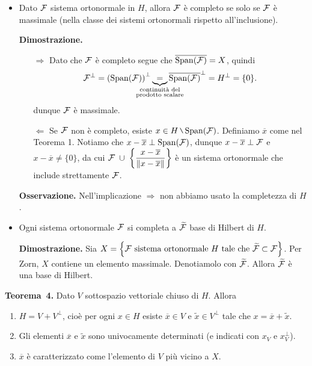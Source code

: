 \begin{itemize}
\newpage

\item Dato $\mathcal{F}$ sistema ortonormale in $H$, allora $\mathcal{F}$ è completo se solo se $\mathcal{F}$ è massimale (nella classe dei sistemi ortonormali rispetto all'inclusione).

\textbf{Dimostrazione.}
\begin{itemize}

\item[$\boxed{\Rightarrow}$] Dato che $\mathcal{F}$ è completo segue che $\overline{\operatorname{Span}(\mathcal{F})} = X$, quindi
%
$$
\mc{F}^{\perp} = \left( \spn(\mc{F}) \right)^\perp
\underbrace{=}_{\mathclap{\substack{\text{continuità del} \\ \text{prodotto scalare}}}} \overline{\spn(\mc{F})}^\perp = H^\perp = \{ 0 \}.
$$
%
dunque $\mathcal{F}$ è massimale.

\item[$\boxed{\Leftarrow}$] Se  $\mathcal{F}$ non è completo, esiste $x \in H \setminus \spn(\mc{F})$.
Definiamo $\overline{x}$ come nel Teorema 1. Notiamo che $x - \overline{x} \perp \operatorname{Span}(\mathcal{F})$, dunque $x - \overline{x} \perp \mathcal{F}$ e $x - \overline{x} \neq \{ 0 \}$, da cui $\displaystyle \mathcal{F} \; \cup \; \left\{ \frac{x - \overline{x}}{\left\lVert x - \overline{x} \right\rVert} \right\}$ è un sistema ortonormale che include strettamente $\mathcal{F}$. \absurd

\end{itemize}


\textbf{Osservazione.} Nell'implicazione $\boxed{\Rightarrow}$ non abbiamo usato la completezza di $H$.

\item Ogni sistema ortonormale $\mathcal{F}$ si completa a $\widetilde{\mathcal{F}}$ base di Hilbert di $H$.

\textbf{Dimostrazione.} Sia $X = \left\{ \mathcal{F} \text{ sistema ortonormale } H \text{ tale che } \widetilde{\mathcal{F}} \subset \mathcal{F} \right\}$.
Per Zorn, $X$ contiene un elemento massimale. Denotiamolo con $\widetilde{\mathcal{F}}$. Allora $\widetilde{\mathcal{F}}$ è una base di Hilbert.


\end{itemize}


\textbf{Teorema~4.} Dato $V$ sottospazio vettoriale chiuso di $H$. Allora
\begin{enumerate}
\item $H = V + V^\perp$, cioè per ogni $x \in H$ esiste $\overline{x} \in V$ e $\tilde{x} \in V^\perp$ tale che $x = \overline{x} + \tilde{x}$.

\item Gli elementi $\overline{x}$ e $\tilde{x}$ sono univocamente determinati (e indicati con $x_V$ e $x_V^\perp$).

\item $\overline{x}$ è caratterizzato come l'elemento di $V$ più vicino a $X$.
\end{enumerate}

